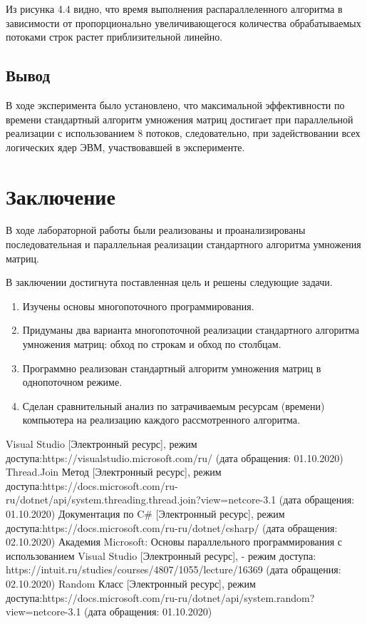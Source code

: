 \documentclass[12pt]{report}
\begin{document}
Из рисунка 4.4 видно, что время выполнения распараллеленного алгоритма в зависимости от пропорционально увеличивающегося количества обрабатываемых потоками строк растет приблизительной линейно.

\section{Вывод}

В ходе эксперимента было установлено, что максимальной эффективности по времени стандартный алгоритм умножения матриц достигает при параллельной реализации с использованием 8 потоков, следовательно, при задействовании всех логических ядер ЭВМ, участвовавшей в эксперименте.


\chapter*{Заключение}
В ходе лабораторной работы были реализованы и проанализированы последовательная и параллельная реализации стандартного алгоритма умножения матриц. 

В заключении достигнута поставленная цель и решены следующие задачи.

\begin{enumerate}
\item Изучены основы многопоточного программирования.
\item  Придуманы два варианта многопоточной реализации стандартного алгоритма умножения матриц: обход по строкам и обход по столбцам.
\item Программно реализован стандартный алгоритм умножения матриц в однопоточном режиме.
\item Сделан сравнительный анализ по затрачиваемым ресурсам (времени) компьютера на реализацию каждого рассмотренного алгоритма.
\end{enumerate}

%
%


\begin{thebibliography}{3}
	Visual Studio [Электронный ресурс], режим доступа:https://visualstudio.microsoft.com/ru/ (дата обращения: 01.10.2020)
	Thread.Join Метод [Электронный ресурс], режим доступа:https://docs.microsoft.com/ru-ru/dotnet/api/system.threading.thread.join?view=netcore-3.1 (дата обращения: 01.10.2020)
	Документация по C\# [Электронный ресурс], режим доступа:https://docs.microsoft.com/ru-ru/dotnet/csharp/ (дата обращения: 02.10.2020)
	Академия Microsoft: Основы параллельного программирования с использованием Visual Studio [Электронный ресурс], - режим доступа: https://intuit.ru/studies/courses/4807/1055/lecture/16369 (дата обращения: 02.10.2020)
	Random Класс [Электронный ресурс], режим доступа:https://docs.microsoft.com/ru-ru/dotnet/api/system.random?view=netcore-3.1 (дата обращения: 01.10.2020)
\end{thebibliography}
\end{document}
